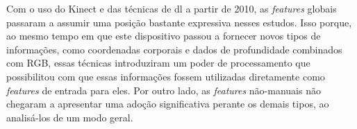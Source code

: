 % 


Com o uso do Kinect e das técnicas de \acrlong{dl} a partir de 2010, as \textit{features} globais passaram a assumir uma posição bastante expressiva nesses estudos. Isso porque, ao mesmo tempo em que este dispositivo passou a fornecer novos tipos de informações, como coordenadas corporais e dados de profundidade combinados com RGB, essas técnicas introduziram um poder de processamento que possibilitou com que essas informações fossem utilizadas diretamente como \textit{features} de entrada para eles.
Por outro lado, as \textit{features} não-manuais não chegaram a apresentar uma adoção significativa perante os demais tipos, ao analisá-los de um modo geral.







